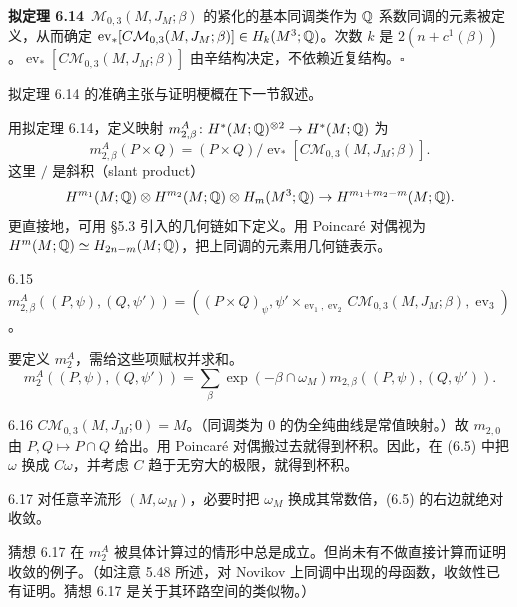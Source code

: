 \par\medskip\noindent\textbf{拟定理 6.14}\ $\mathcal{M}_{0,3}(M,J_M;\beta)$ 的紧化的基本同调类作为 $\mathbb{Q}$ 系数同调的元素被定义，从而确定 $\operatorname{ev}_*[C\mathcal{M}_{0,3}(M,J_M;\beta)]\in H_k(M^3;\mathbb{Q})$。次数 $k$ 是 $2(n+c^1(\beta))$。$\operatorname{ev}_*[C\mathcal{M}_{0,3}(M,J_M;\beta)]$ 由辛结构决定，不依赖近复结构。\hfill$\square$\par\medskip

拟定理 6.14 的准确主张与证明梗概在下一节叙述。

用拟定理 6.14，定义映射 $m^A_{2,\beta}\colon H^*(M;\mathbb{Q})^{\otimes2}\to H^*(M;\mathbb{Q})$ 为
\[
  m^A_{2,\beta}(P\times Q)=(P\times Q)/\operatorname{ev}_*[C\mathcal{M}_{0,3}(M,J_M;\beta)].
\]
这里 $/$ 是斜积（slant product）
\[
  H^{m_1}(M;\mathbb{Q})\otimes H^{m_2}(M;\mathbb{Q})\otimes H_m(M^3;\mathbb{Q})\to H^{m_1+m_2-m}(M;\mathbb{Q}).
\]
更直接地，可用 §5.3 引入的几何链如下定义。用 Poincaré 对偶视为 $H^m(M;\mathbb{Q})\simeq H_{2n-m}(M;\mathbb{Q})$，把上同调的元素用几何链表示。

\begin{definition}{6.15}
  $m^A_{2,\beta}((P,\psi),(Q,\psi'))=((P\times Q)_\psi,\psi'\times_{\operatorname{ev}_1,\operatorname{ev}_2}C\mathcal{M}_{0,3}(M,J_M;\beta),\operatorname{ev}_3)$。
\end{definition}

要定义 $m_2^A$，需给这些项赋权并求和。
\begin{equation}
  m_2^A((P,\psi),(Q,\psi'))=\sum_\beta\exp(-\beta\cap\omega_M)m_{2,\beta}((P,\psi),(Q,\psi')). \tag{6.5}
\end{equation}

\begin{remark}{6.16}
  $C\mathcal{M}_{0,3}(M,J_M;0)=M$。（同调类为 0 的伪全纯曲线是常值映射。）故 $m_{2,0}$ 由 $P,Q\mapsto P\cap Q$ 给出。用 Poincaré 对偶搬过去就得到杯积。因此，在 (6.5) 中把 $\omega$ 换成 $C\omega$，并考虑 $C$ 趋于无穷大的极限，就得到杯积。
\end{remark}

\begin{conjecture}{6.17}
  对任意辛流形 $(M,\omega_M)$，必要时把 $\omega_M$ 换成其常数倍，(6.5) 的右边就绝对收敛。
\end{conjecture}

猜想 6.17 在 $m_2^A$ 被具体计算过的情形中总是成立。但尚未有不做直接计算而证明收敛的例子。（如注意 5.48 所述，对 Novikov 上同调中出现的母函数，收敛性已有证明。猜想 6.17 是关于其环路空间的类似物。）

